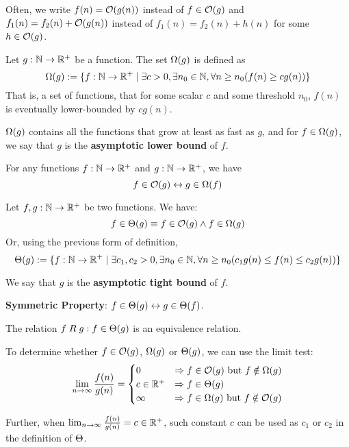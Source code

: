 \begin{remark}
    Often, we write $f(n) = \mathcal{O}(g(n))$ instead of $f \in \mathcal{O}(g)$ and 
    $f_1(n) = f_2(n) + \mathcal{O}(g(n))$ instead of $f_1(n) = f_2(n) + h(n)$ for some $h \in \mathcal{O}(g)$.
\end{remark}

\begin{definition}
    Let $g:\mathbb{N}\to\mathbb{R}^+$ be a function. The set $\Omega(g)$ is defined as
    \[
        \Omega(g) := \{f:\mathbb{N}\to\mathbb{R}^+ \mid \exists c>0, \exists n_0\in\mathbb{N}, \forall n\geq n_0 (f(n) \geq c g(n))\}
    \]
    That is, a set of functions, that for some scalar $c$ and some threshold $n_0$,
    $f(n)$ is eventually lower-bounded by $c g(n)$.

    $\Omega(g)$ contains all the functions that grow at least as fast as $g$, and for $f\in\Omega(g)$,
    we say that $g$ is the \textbf{asymptotic lower bound} of $f$.
\end{definition}

\begin{theorem}
    For any functions $f:\mathbb{N}\to\mathbb{R}^+$ and $g:\mathbb{N}\to\mathbb{R}^+$, we have
    \[
        f \in \mathcal{O}(g) \leftrightarrow g \in \Omega(f)
    \]
\end{theorem}

\begin{definition}
    Let $f,g:\mathbb{N}\to\mathbb{R}^+$ be two functions. We have:
    \[
        f\in\Theta(g) \equiv f\in\mathcal{O}(g) \land f\in\Omega(g)
    \]
    Or, using the previous form of definition,
    \[
        \Theta(g) := \{f:\mathbb{N}\to\mathbb{R}^+ \mid \exists c_1, c_2 > 0, \exists n_0\in\mathbb{N}, \forall n\geq n_0 (c_1 g(n) \leq f(n) \leq c_2 g(n))\}
    \]

    We say that $g$ is the \textbf{asymptotic tight bound} of $f$.

    \textbf{Symmetric Property}: $f\in\Theta(g) \leftrightarrow g\in\Theta(f)$.
\end{definition}

\begin{remark}
    The relation $f\mathrel R g: f\in\Theta(g)$ is an equivalence relation.
\end{remark}

\begin{remark}
    To determine whether $f\in\mathcal{O}(g)$, $\Omega(g)$ or $\Theta(g)$, we can use the limit test:
    \[
        \lim_{n\to\infty} \frac{f(n)}{g(n)} =
        \begin{cases}
            0 & \Rightarrow f\in\mathcal{O}(g) \text{ but } f\notin\Omega(g) \\
            c \in \mathbb{R}^+ & \Rightarrow f\in\Theta(g) \\
            \infty & \Rightarrow f\in\Omega(g) \text{ but } f\notin\mathcal{O}(g)
        \end{cases}
    \]

    Further, when $\lim_{n\to\infty} \frac{f(n)}{g(n)} = c \in \mathbb{R}^+$, such constant $c$ can be
    used as $c_1$ or $c_2$ in the definition of $\Theta$.
\end{remark}